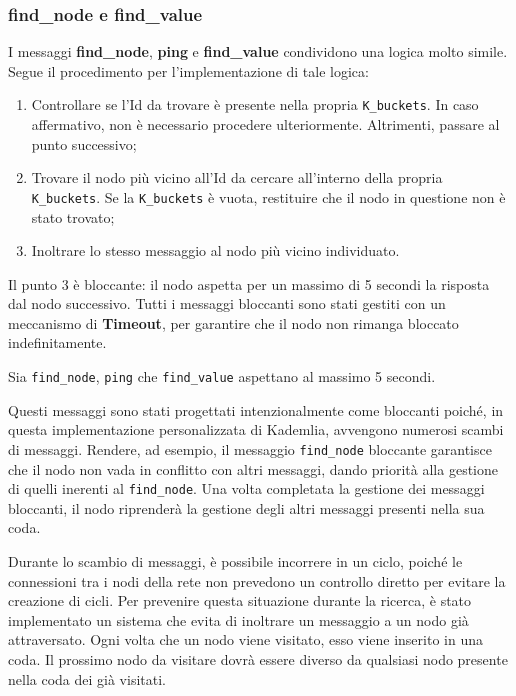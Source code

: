 \documentclass{article}
\begin{document}
\subsubsection{find\_node e find\_value}
I messaggi \textbf{find\_node}, \textbf{ping} e \textbf{find\_value} condividono una logica molto simile. Segue il procedimento per l'implementazione di tale logica:
\begin{enumerate}
    \item Controllare se l'Id da trovare è presente nella propria \texttt{K\_buckets}. In caso affermativo, non è necessario procedere ulteriormente. Altrimenti, passare al punto successivo;
    \item Trovare il nodo più vicino all'Id da cercare all'interno della propria \texttt{K\_buckets}. Se la \texttt{K\_buckets} è vuota, restituire che il nodo in questione non è stato trovato;
    \item Inoltrare lo stesso messaggio al nodo più vicino individuato.
\end{enumerate}
Il punto 3 è bloccante: il nodo aspetta per un massimo di 5 secondi la risposta dal nodo successivo. Tutti i messaggi bloccanti sono stati gestiti con un meccanismo di \textbf{Timeout}, per garantire che il nodo non rimanga bloccato indefinitamente. 

Sia \texttt{find\_node}, \texttt{ping} che \texttt{find\_value} aspettano al massimo 5 secondi.

Questi messaggi sono stati progettati intenzionalmente come bloccanti poiché, in questa implementazione personalizzata di Kademlia, avvengono numerosi scambi di messaggi. Rendere, ad esempio, il messaggio \texttt{find\_node} bloccante garantisce che il nodo non vada in conflitto con altri messaggi, dando priorità alla gestione di quelli inerenti al \texttt{find\_node}. Una volta completata la gestione dei messaggi bloccanti, il nodo riprenderà la gestione degli altri messaggi presenti nella sua coda.

Durante lo scambio di messaggi, è possibile incorrere in un ciclo, poiché le connessioni tra i nodi della rete non prevedono un controllo diretto per evitare la creazione di cicli. Per prevenire questa situazione durante la ricerca, è stato implementato un sistema che evita di inoltrare un messaggio a un nodo già attraversato. Ogni volta che un nodo viene visitato, esso viene inserito in una coda. Il prossimo nodo da visitare dovrà essere diverso da qualsiasi nodo presente nella coda dei già visitati.
\end{document}
